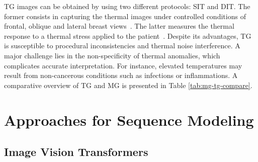 \documentclass[runningheads]{llncs}
\begin{document}
\ac{TG} images can be obtained by using two different protocols:
\ac{SIT} and \ac{DIT}. The former consists in capturing the thermal
images under controlled conditions of frontal, oblique and lateral
breast views~\cite{Ryan2025}. The latter measures the thermal
response to a thermal stress applied to the
patient~\cite{Ryan2025,tsietso2022review}. Despite its advantages, \ac{TG} is
susceptible to procedural inconsistencies and thermal noise
interference. A major challenge lies in the non-specificity of thermal
anomalies, which complicates accurate interpretation. For instance,
elevated temperatures may result from non-cancerous conditions such as
infections or inflammations. A comparative overview of \ac{TG} and
\ac{MG} is presented in Table \ref{tab:mg-tg-compare}.

\section{Approaches for Sequence Modeling}
\label{sec:appr-sequ-model}

\subsection{Image Vision Transformers}
\label{sec:vision-transformers}

\end{document}
